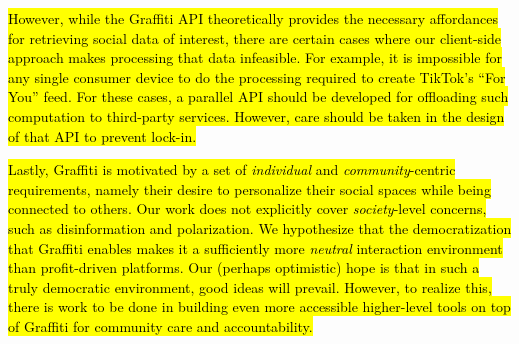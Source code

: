 {\hl{%
However, while the Graffiti API theoretically provides the necessary
affordances for retrieving social data of interest,
there are certain cases where our client-side
approach makes processing that data infeasible.
For example, it is impossible for any single consumer device to
do the processing required to create TikTok's ``For You'' feed.
For these cases, a parallel API should be developed for offloading such
computation to third-party services.
However, care should be taken
in the design of that API to prevent lock-in.
}}%

{\hl{%
Lastly, Graffiti is motivated by a set of \emph{individual} and \emph{community}-centric requirements,
namely their desire to personalize their social spaces while being connected to others.
Our work does not explicitly cover \emph{society}-level concerns,
such as disinformation and polarization.
We hypothesize that the democratization that Graffiti enables
makes it a sufficiently more \emph{neutral} interaction environment than
profit-driven platforms.
Our (perhaps optimistic) hope is that in such a truly democratic environment, good ideas will prevail.
However, to realize this, there is work to be done in building even more
accessible higher-level tools on top of Graffiti for community care and accountability.
}}%











